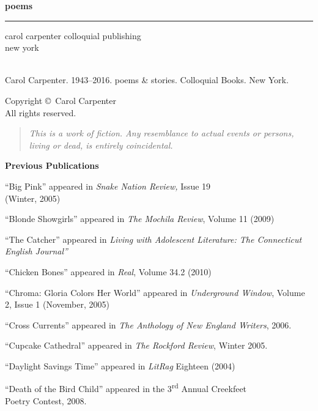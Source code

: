 \documentclass[twoside,10pt]{book}
\author{}
\date{}
\begin{document}
\frontmatter
\pagestyle{empty}
\pagecolor{darkvintageorange}
\color{white} %
\begin{center}
  \vspace*{48pt}
  \hfill {\fontsize{86}{52}\sffamily\bfseries poems}
  \\
  \hrule height 1pt
  \hfill {\fontsize{24}{52}\sffamily carol carpenter}
  \vfill
  \hfill {\sffamily colloquial publishing}
  \\
  \hfill {\sffamily new york}
\end{center}
\color{black} %


\clearpage
\pagecolor{white}
\mbox{}
\\[36pt]
Carol Carpenter. 1943--2016.  poems \& stories. Colloquial Books.  New
York. 
\\[12pt]
\begin{center}
Copyright \copyright\, Carol Carpenter
\\[4pt]
All rights reserved.
\end{center}
\vfill
\begin{quote}
\emph{This is a work of fiction. Any resemblance to actual events or
persons, living or dead, is entirely coincidental.}
\end{quote}
\vfill
\vfill
\null

\clearpage
\pagestyle{fancy}
\noindent
{\Large\bf Previous Publications}

``Big Pink'' appeared in \emph{Snake Nation Review,} Issue 19\\
(Winter, 2005)

``Blonde Showgirls'' appeared in \emph{The Mochila Review}, Volume 11
(2009)

``The Catcher'' appeared in \emph{Living with Adolescent Literature: The
Connecticut English Journal''}

``Chicken Bones'' appeared in \emph{Real}, Volume 34.2 (2010)

``Chroma: Gloria Colors Her World'' appeared in \emph{Underground
Window}, Volume 2, Issue 1 (November, 2005)

``Cross Currents'' appeared in \emph{The Anthology of New England
Writers}, 2006.

``Cupcake Cathedral'' appeared in \emph{The Rockford Review}, Winter
2005.

``Daylight Savings Time'' appeared in \emph{LitRag} Eighteen (2004)

``Death of the Bird Child'' appeared in the 3\textsuperscript{rd} Annual
Creekfeet\\
Poetry Contest, 2008.
\end{document}
